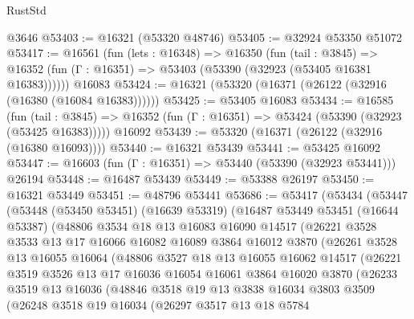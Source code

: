 \begin{lexlean}{RustStd}
\begin{coremodule}
    @3646
@53403 := @16321 (@53320 @48746)
@53405 := @32924 @53350 @51072
@53417 := @16561
    (fun (lets : @16348) =>
    @16350
      (fun (tail : @3845) =>
      @16352 (fun (Γ : @16351) => @53403 (@53390 (@32923 (@53405 @16381 @16383))))))
    @16083
@53424 := @16321 (@53320 (@16371 (@26122 (@32916 (@16380 (@16084 @16383))))))
@53425 := @53405 @16083
@53434 := @16585
    (fun (tail : @3845) => @16352 (fun (Γ : @16351) => @53424 (@53390 (@32923 (@53425 @16383)))))
    @16092
@53439 := @53320 (@16371 (@26122 (@32916 (@16380 @16093))))
@53440 := @16321 @53439
@53441 := @53425 @16092
@53447 := @16603 (fun (Γ : @16351) => @53440 (@53390 (@32923 @53441))) @26194
@53448 := @16487 @53439
@53449 := @53388 @26197
@53450 := @16321 @53449
@53451 := @48796 @53441
@53686 := @53417
    (@53434
      (@53447
        (@53448
          (@53450 @53451)
          (@16639 @53319)
          (@16487
            @53449
            @53451
            (@16644 @53387)
            (@48806
              @3534
              @18
              @13
              @16083
              @16090
              @14517
              (@26221
                @3528
                @3533
                @13
                @17
                @16066
                @16082
                @16089
                @3864
                @16012
                @3870
                (@26261
                  @3528
                  @13
                  @16055
                  @16064
                  (@48806
                    @3527
                    @18
                    @13
                    @16055
                    @16062
                    @14517
                    (@26221
                      @3519
                      @3526
                      @13
                      @17
                      @16036
                      @16054
                      @16061
                      @3864
                      @16020
                      @3870
                      (@26233
                        @3519
                        @13
                        @16036
                        (@48846
                          @3518
                          @19
                          @13
                          @3838
                          @16034
                          @3803
                          @3509
                          (@26248
                            @3518
                            @19
                            @16034
                            (@26297
                              @3517
                              @13
                              @18
                              @5784

\end{coremodule}
\end{lexlean}
